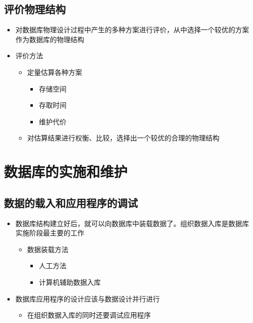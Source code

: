 \subsection{评价物理结构}
\begin{itemize}
    \item 对数据库物理设计过程中产生的多种方案进行评价，从中选择一个较优的方案作为数据库的物理结构
    \item 评价方法
    \begin{itemize}
        \item 定量估算各种方案
        \vspace{-0.8em}
        \begin{multicols}{3}
            \begin{itemize}
                \item 存储空间
                \item 存取时间
                \item 维护代价
            \end{itemize}
        \end{multicols}
        \vspace{-1em}
        \item 对估算结果进行权衡、比较，选择出一个较优的合理的物理结构
    \end{itemize}
\end{itemize}

\section{数据库的实施和维护}

\subsection{数据的载入和应用程序的调试}
\begin{itemize}
    \item 数据库结构建立好后，就可以向数据库中装载数据了。组织数据入库是数据库实施阶段最主要的工作
    \begin{itemize}
        \item 数据装载方法
        \vspace{-0.8em}
        \begin{multicols}{2}
            \begin{itemize}
                \item 人工方法
                \item 计算机辅助数据入库
            \end{itemize}
        \end{multicols}
        \vspace{-1em}
    \end{itemize}
    \item 数据库应用程序的设计应该与数据设计并行进行
    \begin{itemize}
        \item 在组织数据入库的同时还要调试应用程序
    \end{itemize}
\end{itemize}

